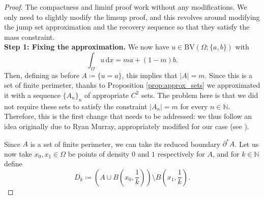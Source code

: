 \documentclass[a4paper, 11pt, reqno]{amsart}
\theoremstyle{plain}
\theoremstyle{definition}
\theoremstyle{remark}
\newcommand{\N}{\mathbb N}
\newcommand{\dd}{\,\mathrm{d}}
\begin{document}
\begin{proof}
The compactness and liminf proof work without any modifications. We only need to slightly modify the limsup proof, and this revolves around modifying the jump set approximation and the recovery sequence so that they satisfy the mass constraint.\\[0.5em]
\textbf{Step 1: Fixing the approximation.} We now have $u \in \mathrm{BV}(\Omega; \{ a,b\})$ with 
$$ \int_\Omega u \dd x = m a + (1-m) b. $$
Then, defining as before $A \coloneqq \{ u = a \}$, this implies that $|A| = m$. Since this is a set of finite perimeter, thanks to Proposition \ref{prop:approx_sets} we approximated it with a sequence $\{A_n\}_n$ of appropriate $C^2$ sets. The problem here is that we did not require these sets to satisfy the constraint $|A_n|=m$ for every $n \in \N$. Therefore, this is the first change that needs to be addressed: we thus follow an idea originally due to Ryan Murray, appropriately modified for our case (see \cite{murray2016slow}).

Since $A$ is a set of finite perimeter, we can take its reduced boundary $\partial^* A$. Let us now take $x_0, x_1 \in \Omega$ be points of density $0$ and $1$ respectively for $A$, and for $k \in \N$ define 
$$ D_k \coloneqq \left( A \cup B \! \left( \! x_0, \frac{1}{k} \! \right) \right) \setminus B \! \left( \! x_1, \frac{1}{k} \! \right). $$


\end{proof}
\end{document}
